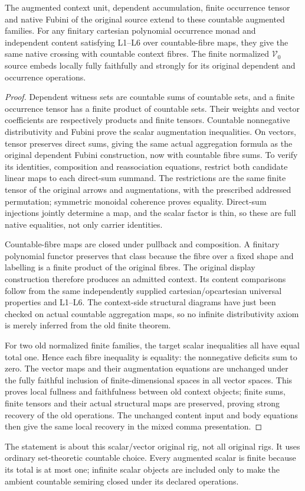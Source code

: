 \documentclass[11pt]{article}
\begin{document}
\begin{lemma}\label{lem:crossing}
The augmented context unit, dependent accumulation, finite occurrence tensor and native Fubini of the original source extend to these countable augmented families. For any finitary cartesian polynomial occurrence monad and independent content satisfying L1--L6 over countable-fibre maps, they give the same native crossing with countable context fibres. The finite normalized $\mathcal V_0$ source embeds locally fully faithfully and strongly for its original dependent and occurrence operations.
\end{lemma}
\begin{proof}
Dependent witness sets are countable sums of countable sets, and a finite occurrence tensor has a finite product of countable sets. Their weights and vector coefficients are respectively products and finite tensors. Countable nonnegative distributivity and Fubini prove the scalar augmentation inequalities. On vectors, tensor preserves direct sums, giving the same actual aggregation formula as the original dependent Fubini construction, now with countable fibre sums. To verify its identities, composition and reassociation equations, restrict both candidate linear maps to each direct-sum summand. The restrictions are the same finite tensor of the original arrows and augmentations, with the prescribed addressed permutation; symmetric monoidal coherence proves equality. Direct-sum injections jointly determine a map, and the scalar factor is thin, so these are full native equalities, not only carrier identities.

Countable-fibre maps are closed under pullback and composition. A finitary polynomial functor preserves that class because the fibre over a fixed shape and labelling is a finite product of the original fibres. The original display construction therefore produces an admitted context. Its content comparisons follow from the same independently supplied cartesian/opcartesian universal properties and L1--L6. The context-side structural diagrams have just been checked on actual countable aggregation maps, so no infinite distributivity axiom is merely inferred from the old finite theorem.

For two old normalized finite families, the target scalar inequalities all have equal total one. Hence each fibre inequality is equality: the nonnegative deficits sum to zero. The vector maps and their augmentation equations are unchanged under the fully faithful inclusion of finite-dimensional spaces in all vector spaces. This proves local fullness and faithfulness between old context objects; finite sums, finite tensors and their actual structural maps are preserved, proving strong recovery of the old operations. The unchanged content input and body equations then give the same local recovery in the mixed comma presentation.
\end{proof}
The statement is about this scalar/vector original rig, not all original rigs. It uses ordinary set-theoretic countable choice. Every augmented scalar is finite because its total is at most one; infinite scalar objects are included only to make the ambient countable semiring closed under its declared operations.
\end{document}
